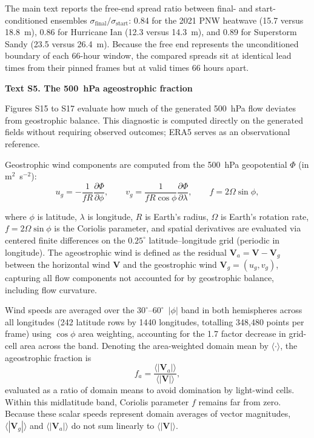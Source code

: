 The main text reports the free-end spread ratio between final- and start-conditioned ensembles $\sigma_{\mathrm{final}} / \sigma_{\mathrm{start}}$: 0.84 for the 2021 PNW heatwave (15.7 versus 18.8~m), 0.86 for Hurricane Ian (12.3 versus 14.3~m), and 0.89 for Superstorm Sandy (23.5 versus 26.4~m). Because the free end represents the unconditioned boundary of each 66-hour window, the compared spreads sit at identical lead times from their pinned frames but at valid times 66 hours apart.

\noindent\textbf{Text S5. The 500~hPa ageostrophic fraction}

Figures S15 to S17 evaluate how much of the generated 500~hPa flow deviates from geostrophic balance. This diagnostic is computed directly on the generated fields without requiring observed outcomes; ERA5 serves as an observational reference.

Geostrophic wind components are computed from the 500~hPa geopotential $\Phi$ (in m$^{2}$~s$^{-2}$):
\begin{equation}
u_{g} = -\frac{1}{fR}\frac{\partial \Phi}{\partial \phi},
\qquad
v_{g} = \frac{1}{fR\cos\phi}\frac{\partial \Phi}{\partial \lambda},
\qquad
f = 2\Omega\sin\phi ,
\end{equation}

where $\phi$ is latitude, $\lambda$ is longitude, $R$ is Earth's radius, $\Omega$ is Earth's rotation rate, $f = 2\Omega\sin\phi$ is the Coriolis parameter, and spatial derivatives are evaluated via centered finite differences on the $0.25^{\circ}$ latitude--longitude grid (periodic in longitude). The ageostrophic wind is defined as the residual $\mathbf{V}_{a} = \mathbf{V} - \mathbf{V}_{g}$ between the horizontal wind $\mathbf{V}$ and the geostrophic wind $\mathbf{V}_{g} = (u_{g}, v_{g})$, capturing all flow components not accounted for by geostrophic balance, including flow curvature.

Wind speeds are averaged over the $30^{\circ}$--$60^{\circ}$~$|\phi|$ band in both hemispheres across all longitudes (242 latitude rows by 1440 longitudes, totalling 348,480 points per frame) using $\cos\phi$ area weighting, accounting for the 1.7 factor decrease in grid-cell area across the band. Denoting the area-weighted domain mean by $\langle \cdot \rangle$, the ageostrophic fraction is
\begin{equation}
f_{a} = \frac{\langle |\mathbf{V}_{a}| \rangle}{\langle |\mathbf{V}| \rangle} ,
\end{equation}
evaluated as a ratio of domain means to avoid domination by light-wind cells. Within this midlatitude band, Coriolis parameter $f$ remains far from zero. Because these scalar speeds represent domain averages of vector magnitudes, $\langle |\mathbf{V}_{g}| \rangle$ and $\langle |\mathbf{V}_{a}| \rangle$ do not sum linearly to $\langle |\mathbf{V}| \rangle$.

